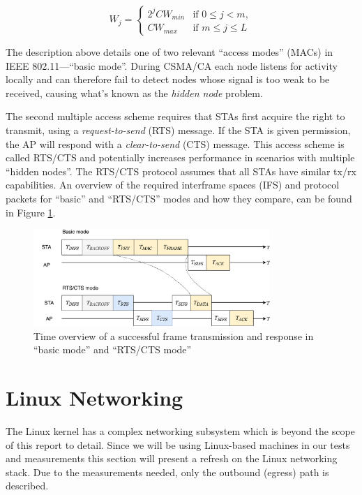 \begin{equation} \label{eq:cwj}
W_j = \left\{
    \begin{array}{ll}
        2^j \mathit{CW}_{min}  & \mbox{if } 0 \leq j < m, \\
        \mathit{CW}_{max}      & \mbox{if } m \leq j \leq L
    \end{array}
\right.
\end{equation}

The description above details one of two relevant ``access modes'' (MACs) in
IEEE 802.11—``basic mode''. During CSMA/CA each node listens for activity
locally and can therefore fail to detect nodes whose signal is too weak to be
received, causing what's known as the \emph{hidden node} problem.

The second multiple access scheme requires that STAs first acquire the right
to transmit, using a \emph{request-to-send} (RTS) message. If the STA is given
permission, the AP will respond with a \emph{clear-to-send} (CTS) message.
This access scheme is called RTS/CTS and potentially increases performance in
scenarios with multiple ``hidden nodes''. The RTS/CTS protocol assumes that
all STAs  have similar tx/rx capabilities. An overview of the required
interframe spaces (IFS) and protocol packets for ``basic'' and ``RTS/CTS''
modes and how they compare, can be found in Figure \ref{fig:timings}. 

\begin{figure}
\center
\includegraphics[width=0.8\textwidth]{images/time-overview.pdf}
\caption{Time overview of a successful frame transmission and response in ``basic mode'' and ``RTS/CTS mode''}
\label{fig:timings}
\end{figure}


\section{Linux Networking}

The Linux kernel has a complex networking subsystem which is beyond the scope
of this report to detail. Since we will be using Linux-based machines in our
tests and measurements this section will present a refresh on the Linux
networking stack. Due to the measurements needed, only the outbound (egress)
path is described.

